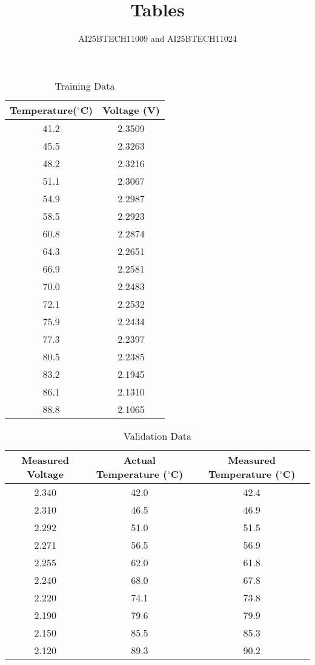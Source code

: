 \documentclass{article}
\title{Tables}
\author{AI25BTECH11009 and AI25BTECH11024}
\date{}
\begin{document}
\maketitle

\begin{table}[h!]
\centering
\begin{tabular}{c|c}
Temperature($^\circ$C) & Voltage (V) \\
\hline
41.2 & 2.3509 \\
45.5 & 2.3263 \\
48.2 & 2.3216 \\
51.1 & 2.3067 \\
54.9 & 2.2987 \\
58.5 & 2.2923 \\
60.8 & 2.2874 \\
64.3 & 2.2651 \\
66.9 & 2.2581 \\
70.0 & 2.2483 \\
72.1 & 2.2532 \\
75.9 & 2.2434 \\
77.3 & 2.2397 \\
80.5 & 2.2385 \\
83.2 & 2.1945 \\
86.1 & 2.1310 \\
88.8 & 2.1065 \\
\end{tabular}
\caption{Training Data}
\label{training data}
\end{table}

\vspace{2cm}

\begin{table}[h!]
\centering
\begin{tabular}{c|c|c}
Measured Voltage & Actual Temperature ($^\circ$C) & Measured Temperature ($^\circ$C) \\
\hline
2.340 & 42.0 & 42.4 \\
2.310 & 46.5 & 46.9 \\
2.292 & 51.0 & 51.5 \\
2.271 & 56.5 & 56.9 \\
2.255 & 62.0 & 61.8 \\
2.240 & 68.0 & 67.8 \\
2.220 & 74.1 & 73.8 \\
2.190 & 79.6 & 79.9 \\
2.150 & 85.5 & 85.3 \\
2.120 & 89.3 & 90.2 \\
\end{tabular}
\caption{Validation Data}
\label{validation}
\end{table}
\end{document}
